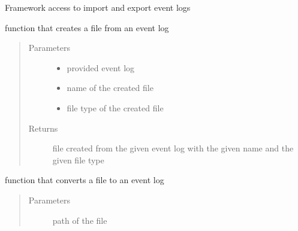 \documentclass[letterpaper,10pt,english]{sphinxmanual}
\begin{document}
\begin{fulllineitems}
\label{\detokenize{eventLogConverter:eventLogConverter.fileUtility.FileUtilityBase}}
Framework access to import and export event logs

\begin{fulllineitems}
\label{\detokenize{eventLogConverter:eventLogConverter.fileUtility.FileUtilityBase.createFile}}
function that creates a file from an event log
\begin{quote}\begin{description}
\item[{Parameters}] \leavevmode\begin{itemize}
\item {} 
 \textendash{} provided event log

\item {} 
 \textendash{} name of the created file

\item {} 
 \textendash{} file type of the created file

\end{itemize}

\item[{Returns}] \leavevmode
file created from the given event log with the given name and the given file type

\end{description}\end{quote}

\end{fulllineitems}


\begin{fulllineitems}
\label{\detokenize{eventLogConverter:eventLogConverter.fileUtility.FileUtilityBase.getEventLogFromFile}}
function that converts a file to an event log
\begin{quote}\begin{description}
\item[{Parameters}] \leavevmode
{} \textendash{} path of the file


\end{description}
\end{quote}
\end{fulllineitems}
\end{fulllineitems}
\end{document}
